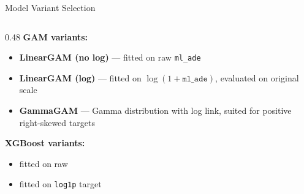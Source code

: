 \begin{frame}[t]{Model Variant Selection}
  \begin{columns}[T,onlytextwidth]
    \begin{column}{0.48\textwidth}
      \small
      \textbf{GAM variants:}
      \begin{itemize}\setlength\itemsep{0.15em}
        \item \textbf{LinearGAM (no log)} — fitted on raw \texttt{ml\_ade}
        \item \textbf{LinearGAM (log)} — fitted on
              $\log(1+\texttt{ml\_ade})$, evaluated on original scale
        \item \textbf{GammaGAM} — Gamma distribution with log link,
              suited for positive right-skewed targets
      \end{itemize}
      \vspace{0.25em}
      \textbf{XGBoost variants:}
      \begin{itemize}\setlength\itemsep{0.15em}
        \item fitted on raw
        \item fitted on \texttt{log1p} target
      \end{itemize}
      \vspace{0.45em}
    \end{column}


\end{columns}
\end{frame}
